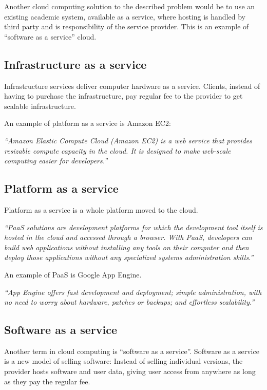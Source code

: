 Another cloud computing solution to the described problem would be to use an existing academic system, available as a service, where hosting is handled by third party and is responsibility of the service provider. This is an example of ``software as a service'' cloud. \citep{cloud_book}

\subsection{Infrastructure as a service}

Infrastructure services deliver computer hardware as a service. Clients, instead of having to purchase the infrastructure, pay regular fee to the provider to get scalable infrastructure.

An example of platform as a service is Amazon EC2:

\emph{``Amazon Elastic Compute Cloud (Amazon EC2) is a web service that provides resizable compute capacity in the cloud. It is designed to make web-scale computing easier for developers.''} \citep{amazon}

\subsection{Platform as a service}

Platform as a service is a whole platform moved to the cloud. 

\emph{``PaaS solutions are development platforms for which the development tool itself is hosted in the cloud and accessed through a browser. With PaaS, developers can build web applications without installing any tools on their computer and then deploy those applications without any specialized systems administration skills.''} \citep{paas}

An example of PaaS is Google App Engine.

\emph{``App Engine offers fast development and deployment; simple administration, with no need to worry about hardware, patches or backups; and effortless scalability.''} \citep{google_appengine}

\subsection{Software as a service}

Another term in cloud computing is ``software as a service''. Software as a service is a new model of selling software: Instead of selling individual versions, the provider hosts software and user data, giving user access from anywhere as long as they pay the regular fee. \citep{cloud_book}